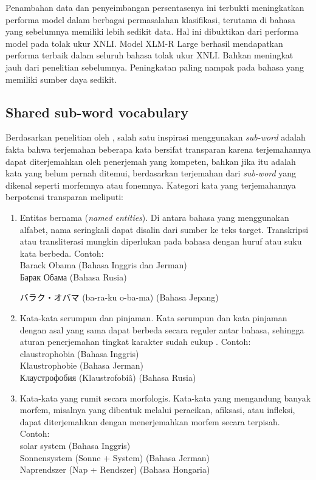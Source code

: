    Penambahan data dan penyeimbangan persentasenya ini terbukti meningkatkan performa model dalam berbagai permasalahan klasifikasi, terutama di bahasa yang sebelumnya memiliki lebih sedikit data. Hal ini dibuktikan dari performa model pada tolak ukur XNLI. Model XLM-R Large berhasil mendapatkan performa terbaik dalam seluruh bahasa tolak ukur XNLI. Bahkan meningkat jauh dari penelitian \parencite{LampleConneau2019} sebelumnya. Peningkatan paling nampak pada bahasa yang memiliki sumber daya sedikit.


    \subsection{Shared sub-word vocabulary}
    Berdasarkan penelitian oleh \parencite{Sennrich_Haddow_Birch_2016}, salah satu inspirasi menggunakan \textit{sub-word} adalah fakta bahwa terjemahan beberapa kata bersifat transparan karena terjemahannya dapat diterjemahkan oleh penerjemah yang kompeten, bahkan jika itu adalah kata yang belum pernah ditemui, berdasarkan terjemahan dari \textit{sub-word} yang dikenal seperti morfemnya atau fonemnya. Kategori kata yang terjemahannya berpotensi transparan meliputi:

    \begin{enumerate}
        \item Entitas bernama (\textit{named entities}). Di antara bahasa yang menggunakan alfabet, nama seringkali dapat disalin dari sumber ke teks target. Transkripsi atau transliterasi mungkin diperlukan pada bahasa dengan huruf atau suku kata berbeda. Contoh: \\
        Barack Obama (Bahasa Inggris dan Jerman) \\
        \foreignlanguage{russian}{Барак Обама} (Bahasa Rusia) \\
        \begin{CJK}{UTF8}{min}
        バラク・オバマ (ba-ra-ku o-ba-ma) (Bahasa Jepang)
        \end{CJK}

        \item Kata-kata serumpun dan pinjaman. Kata serumpun dan kata pinjaman dengan asal yang sama dapat berbeda secara reguler antar bahasa, sehingga aturan penerjemahan tingkat karakter sudah cukup \parencite{Tiedemann2012}. Contoh:  \\
        claustrophobia (Bahasa Inggris) \\
        Klaustrophobie (Bahasa Jerman) \\
        \foreignlanguage{russian}{Клаустрофобия} (Klaustrofobiâ) (Bahasa Rusia)

        \item Kata-kata yang rumit secara morfologis. Kata-kata yang mengandung banyak morfem, misalnya yang dibentuk melalui peracikan, afiksasi, atau infleksi, dapat diterjemahkan dengan menerjemahkan morfem secara terpisah. Contoh:  \\
        solar system (Bahasa Inggris) \\
        Sonnensystem (Sonne + System) (Bahasa Jerman) \\
        Naprendszer (Nap + Rendszer) (Bahasa Hongaria)
    \end{enumerate}

